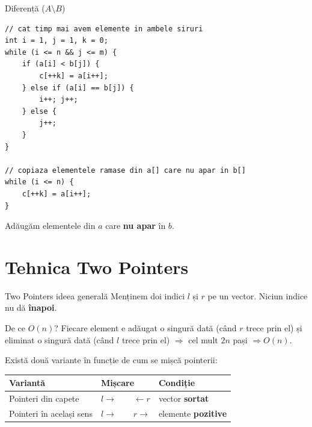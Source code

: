 ﻿\documentclass{beamer}
\begin{document}
\begin{frame}[fragile]{Diferență ($A \setminus B$)}
  \begin{lstlisting}
// cat timp mai avem elemente in ambele siruri
int i = 1, j = 1, k = 0;
while (i <= n && j <= m) {
    if (a[i] < b[j]) {
        c[++k] = a[i++];
    } else if (a[i] == b[j]) {
        i++; j++;
    } else {
        j++;
    }
}

// copiaza elementele ramase din a[] care nu apar in b[]
while (i <= n) {
    c[++k] = a[i++];
}
  \end{lstlisting}
  Adăugăm elementele din $a$ care \textbf{nu apar} în $b$.
\end{frame}

\section{Tehnica Two Pointers}

\begin{frame}{Two Pointers \textemdash{} ideea generală}
  Menținem doi indici $l$ și $r$ pe un vector. Niciun indice nu dă \textbf{înapoi}.

  \begin{block}{De ce $O(n)$?}
    Fiecare element e adăugat o singură dată (când $r$ trece prin el)
    și eliminat o singură dată (când $l$ trece prin el) $\Rightarrow$ cel mult $2n$ pași $\Rightarrow O(n)$.
  \end{block}

  \smallskip
  Există două variante în funcție de cum se mișcă pointerii:

  \begin{center}
  \begin{tabular}{lll}
    \toprule
    Variantă & Mișcare & Condiție \\
    \midrule
    Pointeri din capete      & $l \to\qquad\leftarrow r$ & vector \textbf{sortat} \\
    Pointeri în același sens & $l \to\qquad r \to$       & elemente \textbf{pozitive} \\
    \bottomrule
  \end{tabular}
  \end{center}
\end{frame}
\end{document}

